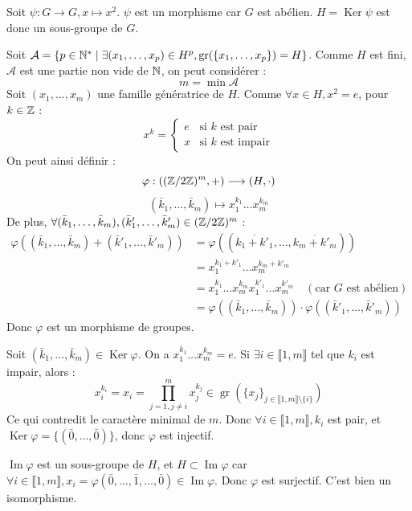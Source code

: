 \begin{solution}
Soit $\psi : G \to G, x \mapsto x^2$. $\psi$ est un morphisme car $G$ est abélien.
$H = \operatorname{Ker} \psi$ est donc un sous-groupe de $G$.

Soit $\mathcal{A} = \{p \in \mathbb N^* \mid \exists (x_1, \dots, x_p) \in H^p, \operatorname{gr}(\{x_1, \dots, x_p\}) = H\}$. Comme $H$ est fini, $\mathcal{A}$ est une partie non vide de $\mathbb N$, on peut considérer :
\[ m = \min \mathcal{A} \]
Soit $(x_1, \dots, x_m)$ une famille génératrice de $H$.
Comme $\forall x \in H, x^2 = e$, pour $k \in \mathbb Z$ :
\[ x^k = \begin{cases} e & \text{si } k \text{ est pair} \\ x & \text{si } k \text{ est impair} \end{cases} \]
On peut ainsi définir :
\[ \varphi : \left((\mathbb Z/2\mathbb Z)^m, +\right) \longrightarrow (H, \cdot) \]
\[ (\bar{k}_1, \dots, \bar{k}_m) \longmapsto x_1^{k_1} \dots x_m^{k_m} \]
De plus, $\forall (\bar{k}_1, \dots, \bar{k}_m), (\bar{k}'_1, \dots, \bar{k}'_m) \in (\mathbb Z/2\mathbb Z)^m$ :
\begin{align*}
\varphi((\bar{k}_1, \dots, \bar{k}_m) + (\bar{k}'_1, \dots, \bar{k}'_m)) &= \varphi((\overline{k_1+k'_1}, \dots, \overline{k_m+k'_m})) \\
&= x_1^{k_1+k'_1} \dots x_m^{k_m+k'_m} \\
&= x_1^{k_1} \dots x_m^{k_m} x_1^{k'_1} \dots x_m^{k'_m} \quad (\text{car } G \text{ est abélien}) \\
&= \varphi((\bar{k}_1, \dots, \bar{k}_m)) \cdot \varphi((\bar{k}'_1, \dots, \bar{k}'_m))
\end{align*}
Donc $\varphi$ est un morphisme de groupes.

Soit $(\bar{k}_1, \dots, \bar{k}_m) \in \operatorname{Ker} \varphi$. On a $x_1^{k_1} \dots x_m^{k_m} = e$.
Si $\exists i \in \llbracket 1, m \rrbracket$ tel que $k_i$ est impair, alors :
\[ x_i^{k_i} = x_i = \prod_{j=1, j \neq i}^m x_j^{k_j} \in \operatorname{gr}\left(\{x_j\}_{j \in \llbracket 1, m \rrbracket \setminus \{i\}}\right) \]
Ce qui contredit le caractère minimal de $m$.
Donc $\forall i \in \llbracket 1, m \rrbracket, k_i$ est pair, et $\operatorname{Ker} \varphi = \{(\bar{0}, \dots, \bar{0})\}$, donc $\varphi$ est injectif.

$\operatorname{Im} \varphi$ est un sous-groupe de $H$, et $H \subset \operatorname{Im} \varphi$ car $\forall i \in \llbracket 1, m \rrbracket, x_i = \varphi(\bar{0}, \dots, \bar{1}, \dots, \bar{0}) \in \operatorname{Im} \varphi$.
Donc $\varphi$ est surjectif. C'est bien un isomorphisme.


\end{solution}
